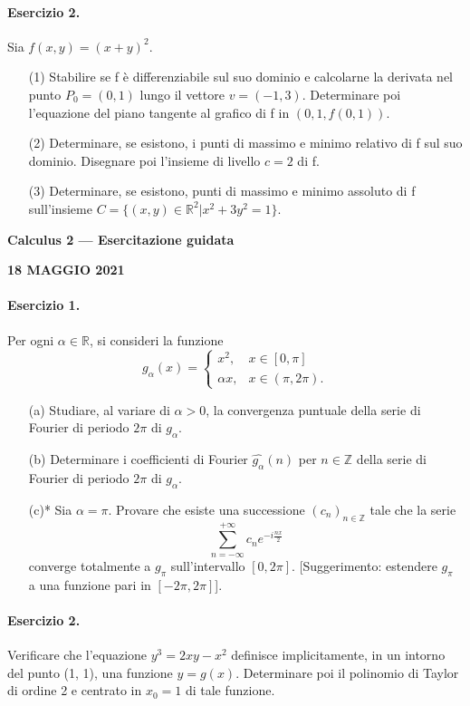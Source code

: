 \documentclass[a4paper, 10pt]{article}
\newcommand{\sectiontitle}[1]{\begin{center}\large\bfseries #1\end{center}}
\newcommand{\exercisecenter}[1]{\begin{center}\bfseries #1\end{center}}
\begin{document}
\paragraph{Esercizio 2.} Sia $f(x,y)=(x+y)^{2}$.
\begin{enumerate}
    \item[(1)] Stabilire se f è differenziabile sul suo dominio e calcolarne la derivata nel punto $P_{0}=(0,1)$ lungo il vettore $v=(-1,3).$ Determinare poi l'equazione del piano tangente al grafico di f in $(0,1,f(0,1))$.
    \item[(2)] Determinare, se esistono, i punti di massimo e minimo relativo di f sul suo dominio. Disegnare poi l'insieme di livello $c=2$ di f.
    \item[(3)] Determinare, se esistono, punti di massimo e minimo assoluto di f sull'insieme $C=\{(x,y)\in\mathbb{R}^{2}|x^{2}+3y^{2}=1\}$.
\end{enumerate}

\newpage

\sectiontitle{Calculus 2 --- Esercitazione guidata}
\exercisecenter{18 MAGGIO 2021}

\paragraph{Esercizio 1.} Per ogni $\alpha\in\mathbb{R}$, si consideri la funzione
\[ g_{\alpha}(x)=\begin{cases}x^{2},&x\in[0,\pi]\\ \alpha x,&x\in(\pi,2\pi).\end{cases} \]
\begin{enumerate}
    \item[(a)] Studiare, al variare di $\alpha>0$, la convergenza puntuale della serie di Fourier di periodo $2\pi$ di $g_{\alpha}$.
    \item[(b)] Determinare i coefficienti di Fourier $\hat{g_{\alpha}}(n)$ per $n\in\mathbb{Z}$ della serie di Fourier di periodo $2\pi$ di $g_{\alpha}$.
    \item[(c)*] Sia $\alpha=\pi.$ Provare che esiste una successione $(c_{n})_{n\in\mathbb{Z}}$ tale che la serie
    \[ \sum_{n=-\infty}^{+\infty}c_{n}e^{-i\frac{nx}{2}} \]
    converge totalmente a $g_{\pi}$ sull'intervallo $[0,2\pi]$. [Suggerimento: estendere $g_{\pi}$ a una funzione pari in $[-2\pi,2\pi]$].
\end{enumerate}

\paragraph{Esercizio 2.} Verificare che l'equazione $y^{3}=2xy-x^{2}$ definisce implicitamente, in un intorno del punto (1, 1), una funzione $y=g(x).$ Determinare poi il polinomio di Taylor di ordine 2 e centrato in $x_{0}=1$ di tale funzione.
\end{document}
